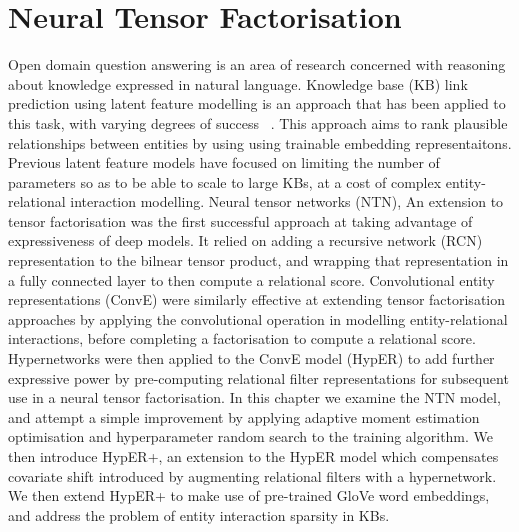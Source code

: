 \chapter{Neural Tensor Factorisation}


\ifpdf
    \graphicspath{{Chapter3/Figs/Raster/}{Chapter3/Figs/PDF/}{Chapter3/Figs/}}
\else
    \graphicspath{{Chapter3/Figs/Vector/}{Chapter3/Figs/}}
\fi


Open domain question answering is an area of research concerned with reasoning about knowledge expressed in natural language. Knowledge base (KB) link prediction using latent feature modelling is an approach that has been applied to this task, with varying degrees of success  ~\citep{nguyen2017novel, diefenbach2018wdaqua, kristiadi2019incorporating}. This approach aims to rank plausible relationships between entities by using using trainable embedding representaitons. Previous latent feature models have focused on limiting the number of parameters so as to be able to scale to large KBs, at a cost of complex entity-relational interaction modelling. \newline
Neural tensor networks (NTN), An extension to tensor factorisation was the first successful approach at taking advantage of expressiveness of deep models. It relied on adding a recursive network (RCN) representation to the bilnear tensor product, and wrapping that representation in a fully connected layer to then compute a relational score. Convolutional entity representations (ConvE) were similarly effective at extending tensor factorisation approaches by applying the convolutional operation in modelling entity-relational interactions, before completing a factorisation to compute a relational score. Hypernetworks were then applied to the ConvE model (HypER) to add further expressive power by pre-computing relational filter representations for subsequent use in a neural tensor factorisation. \newline
In this chapter we examine the NTN model, and attempt a simple improvement by applying adaptive moment estimation optimisation and hyperparameter random search to the training algorithm. We then introduce HypER+, an extension to the HypER model which compensates covariate shift introduced by augmenting relational filters with a hypernetwork. We then extend HypER+ to make use of pre-trained GloVe word embeddings, and address the problem of entity interaction sparsity in KBs.



